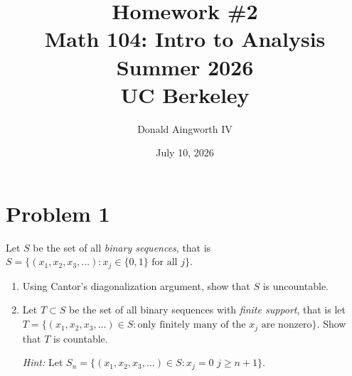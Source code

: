 \documentclass[11pt]{article}
\title{Homework \#2\\{\large Math 104: Intro to Analysis \\ Summer 2026} \\ {\normalsize UC Berkeley}}
\date{July 10, 2026}
\author{Donald Aingworth IV}
\begin{document}
\renewcommand\qedsymbol{OE$\Delta$}
\newcommand{\abs}[1]{\left| #1 \right|}
\newcommand{\andtxt}{\text{ and }}
\newcommand{\Ais}{\ensuremath{\overset{A}{=}}}
\newcommand{\Cis}{\ensuremath{\overset{C}{=}}}
\newcommand{\closure}[1]{\ensuremath{\overline{#1}}}
\newcommand{\encircle}[1]{%
  \tikz[baseline=(char.base)]{%
    \node[shape=circle, draw, inner sep=1pt] (char) {#1};%
  }%
}
\newcommand{\mathif}{\text{if }}
\newcommand{\seq}[2][n]{\ensuremath{(#2 _{#1})}}
\newcommand{\zz}[1]{$\mathbb{Z}/ #1 \mathbb{Z}$}

\maketitle

\tableofcontents

\pagebreak
\section{Problem 1}
    Let $S$ be the set of all \textit{binary sequences}, that is $S = \{(x_1, x_2, x_3, \dots ) : x_j \in \{0, 1\} \text{ for all } j\}$. 
    \begin{enumerate}[label=(\alph*)]
        \item 
        Using Cantor's diagonalization argument, show that $S$ is uncountable.

        \item 
        Let $T \subset S$ be the set of all binary sequences with \textit{finite support}, that is let \\$T = \{(x_1, x_2, x_3, \dots) \in S : \text{only finitely many of the $x_j$ are nonzero}\}.$ Show that $T$ is countable.
        
        \textit{Hint:} Let $S_n = \{(x_1, x_2, x_3, \dots ) \in S : x_j = 0$  $j \geq n + 1\}$.
        
    \end{enumerate}
\end{document}
